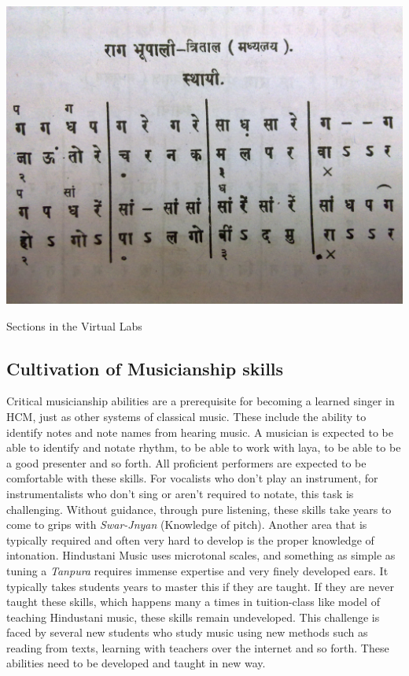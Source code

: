 \documentclass{tufte-handout}
\begin{document}
\begin{marginfigure}%
  \includegraphics[width=\linewidth]{bhatk1.jpg}
  \caption{Sections in the Virtual Labs}
  \label{fig:marginfig}
\end{marginfigure}


\subsection{Cultivation of Musicianship skills} Critical musicianship abilities are a prerequisite for becoming a learned singer in HCM, just as other systems of classical music. These include the ability to identify notes and note names from hearing music. A musician is expected to be able to identify and notate rhythm, to be able to work with laya, to be able to be a good presenter and so forth. All proficient performers are expected to be comfortable with these skills. For vocalists who don't play an instrument, for instrumentalists who don't sing or aren't required to notate, this task is challenging. Without guidance, through pure listening, these skills take years to come to grips with \textit{Swar-Jnyan} (Knowledge of pitch). Another area that is typically required and often very hard to develop is the proper knowledge of intonation. Hindustani Music uses microtonal scales, and something as simple as tuning a \textit{Tanpura} requires immense expertise and very finely developed ears. It typically takes students years to master this if they are taught. If they are never taught these skills, which happens many a times in tuition-class like model of teaching Hindustani music, these skills remain undeveloped. This challenge is faced by several new students who study music using new methods such as reading from texts, learning with teachers over the internet and so forth. These abilities need to be developed and taught in new way. 
\end{document}
